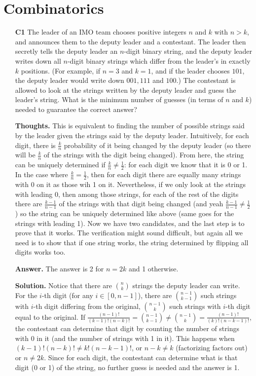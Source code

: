 \documentclass[11pt,a4paper]{article}
\begin{document}
\section{Combinatorics}
\begin{itemize}
\item[\textbf{C1}]
 The leader of an IMO team chooses positive integers $n$ and $k$ with $n > k$, and announces them to the deputy leader and a contestant. The leader then secretly tells the deputy leader an $n$-digit binary string, and the deputy leader writes down all $n$-digit binary strings which differ from the leader’s in exactly $k$ positions. (For example, if $n = 3$ and $k = 1$, and if the leader chooses $101$, the deputy leader would write down $001, 111$ and $100$.) The contestant is allowed to look at the strings written by the deputy leader and guess the leader’s string. What is the minimum number of guesses (in terms of $n$ and $k$) needed to guarantee the correct answer?

\textbf{Thoughts.} 
This is equivalent to finding the number of possible strings said by the leader given the strings said by the deputy leader. 
Intuitively, for each digit, there is $\frac kn$ probability of it being changed by the deputy leader (so there will be $\frac kn$ of the strings with the digit being changed). 
From here, the string can be uniquely determined if $\frac kn\neq \frac 12$: 
for each digit we know that it is 0 or 1.  
In the case where $\frac kn=\frac 12$, 
then for each digit there are equally many strings with 0 on it as those wih 1 on it. 
Nevertheless, if we only look at the strings with leading 0, 
then among those strings, for each of the rest of the digits there are $\frac{k-1}{n-1}$ of the strings with that digit being changed 
(and yeah $\frac{k-1}{n-1}\neq \frac 12$) 
so the string can be uniquely determined like above (same goes for the strings with leading 1). 
Now we have two candidates, and the last step is to prove that it works. 
The verification might sound difficult, but again all we need is to show that if one string works, the string determined by flipping all digits works too.

\textbf{Answer.} The answer is 2 for $n=2k$ and 1 otherwise. 

\textbf{Solution.}
Notice that there are $\binom nk$ strings the deputy leader can write. 
For the $i$-th digit (for any $i\in [0, n-1]$), there are $\binom {n-1}{k-1}$ such strings with $i$-th digit differing from the original, 
$\binom {n-1}k$ such strings with $i$-th digit equal to the original. 
If $\frac{(n-1)!}{(k-1)!(n-k)!}=\binom {n-1}{k-1}\neq \binom {n-1}k=\frac{(n-1)!}{(k)!(n-k-1)!}$, the contestant can determine that digit by counting the number of strings with 0 in it (and the number of strings with 1 in it). 
This happens when $(k-1)!(n-k)!\neq k!(n-k-1)!$, or $n-k\neq k$ (factorizing factors out) or $n\neq 2k$. 
Since for each digit, the contestant can determine what is that digit (0 or 1) of the string, no further guess is needed and the answer is 1.


\end{itemize}
\end{document}

